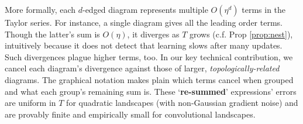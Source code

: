   More formally, each $d$-edged diagram represents multiple $O(\eta^d)$ terms
in the Taylor series.  For instance, a single diagram gives all the leading
order terms.  Though the latter's sum is $O(\eta)$, it diverges as $T$ grows
(c.f. Prop \ref{prop:nest}), intuitively because it does not detect that
learning slows after many updates.  Such divergences plague higher terms, too.
%
In our key technical contribution, we cancel each diagram's divergence against
those of larger, \emph{topologically-related} diagrams.  The graphical notation makes
plain which terms cancel when grouped and what each group's remaining sum is. 
%
These `\textbf{re-summed}' expressions' errors are uniform in $T$ for quadratic
landscapes (with non-Gaussian gradient noise) and are provably finite and
empirically small for convolutional landscapes.

%
%
%
%

